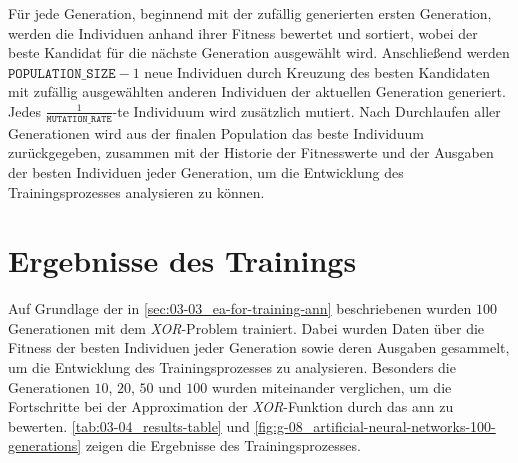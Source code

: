Für jede Generation, beginnend mit der zufällig generierten ersten Generation, werden die Individuen anhand ihrer Fitness bewertet und sortiert, wobei der beste Kandidat für die nächste Generation ausgewählt wird. Anschließend werden $\texttt{POPULATION\_SIZE} - 1$ neue Individuen durch Kreuzung des besten Kandidaten mit zufällig ausgewählten anderen Individuen der aktuellen Generation generiert. Jedes $\frac{1}{\texttt{MUTATION\_RATE}}$-te Individuum wird zusätzlich mutiert. Nach Durchlaufen aller Generationen wird aus der finalen Population das beste Individuum zurückgegeben, zusammen mit der Historie der Fitnesswerte und der Ausgaben der besten Individuen jeder Generation, um die Entwicklung des Trainingsprozesses analysieren zu können.

\section{Ergebnisse des Trainings}
\label{sec:03-04_results-of-training}

Auf Grundlage der in \autoref{sec:03-03_ea-for-training-ann} beschriebenen  wurden $100$ Generationen mit dem \textit{XOR}-Problem trainiert. Dabei wurden Daten über die Fitness der besten Individuen jeder Generation sowie deren Ausgaben gesammelt, um die Entwicklung des Trainingsprozesses zu analysieren. Besonders die Generationen $10$, $20$, $50$ und $100$ wurden miteinander verglichen, um die Fortschritte bei der Approximation der \textit{XOR}-Funktion durch das \Gls{ann} zu bewerten. \autoref{tab:03-04_results-table} und \autoref{fig:g-08_artificial-neural-networks-100-generations} zeigen die Ergebnisse des Trainingsprozesses.

